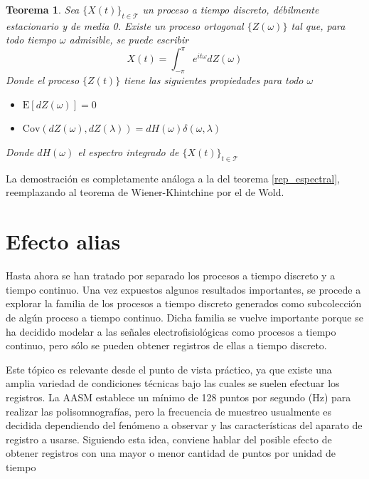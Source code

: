 \documentclass[12pt,letterpaper]{book}
\newtheorem{teorema}{Teorema}[chapter]
\newcommand{\intPI}{\int_{-\pi}^{\pi}}
\newcommand{\E}[1]{\mathrm{E}\left[ #1 \right]}
\newcommand{\Cov}[1]{\mathrm{Cov}\left( #1 \right)}
\newcommand{\abso}[1]{\left| #1 \right|}
\newcommand{\xt}{$\{X(t)\}_{t\in \mathcal{T}}$ }
\newcommand{\hz}{\si{\hertz}\xspace}
\begin{document}
\begin{teorema}
Sea \xt un proceso a tiempo discreto, débilmente estacionario y de media 0. Existe un proceso ortogonal $\{Z(\omega)\}$ tal que, para todo tiempo $\omega$ admisible, se puede escribir
\begin{equation*}
X(t) = \intPI e^{i t \omega} dZ(\omega)
\end{equation*}
Donde el proceso $\{Z(t)\}$ tiene las siguientes propiedades para todo $\omega$
\begin{itemize}
\item $\E{dZ(\omega)} = 0$
\item $\Cov{dZ(\omega),dZ(\lambda)} = dH(\omega) \delta(\omega, \lambda)$
\end{itemize}
Donde $dH(\omega)$ el espectro integrado de \xt
\label{rep_espectral2}
\end{teorema}

La demostración es completamente análoga a la del teorema \ref{rep_espectral}, reemplazando al teorema de Wiener-Khintchine por el de Wold. 


\section{Efecto {alias}}

Hasta ahora se han tratado por separado los procesos a tiempo discreto y a tiempo continuo. 
%
Una vez expuestos algunos resultados importantes, se procede a explorar la familia de los procesos a tiempo discreto generados como subcolección de algún proceso a tiempo continuo. 
%
Dicha familia se vuelve importante porque se ha decidido modelar a las señales electrofisiológicas como procesos a tiempo continuo, pero sólo se pueden obtener registros de ellas a tiempo discreto.

Este tópico es relevante desde el punto de vista práctico, ya que existe una amplia variedad de condiciones técnicas bajo las cuales se suelen efectuar los registros. La AASM establece un mínimo de 128 puntos por segundo (\hz) para realizar las polisomnografías, pero la frecuencia de muestreo usualmente es decidida dependiendo del fenómeno a observar y las características del aparato de registro a usarse.
%
Siguiendo esta idea, conviene hablar del posible efecto de obtener registros con una mayor o menor cantidad de puntos por unidad de tiempo
\end{document}
